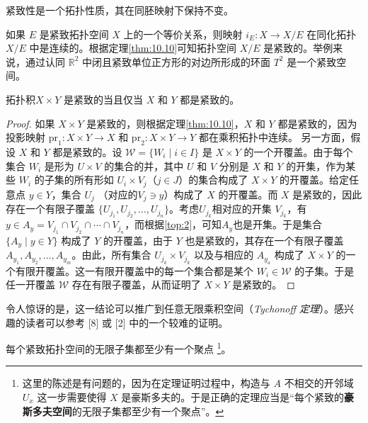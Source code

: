 	紧致性是一个拓扑性质，其在同胚映射下保持不变。

\begin{eg}\label{eg:10.16} 
	如果 $E$ 是紧致拓扑空间 $X$ 上的一个等价关系，则映射 $i_{E} :X\rightarrow X/E$ 在同化拓扑 $X/E$ 中是连续的。根据定理\ref{thm:10.10}可知拓扑空间 $X/E$ 是紧致的。举例来说，通过认同 $\mathbb{R}^{2}$ 中闭且紧致单位正方形的对边所形成的环面 $T^{2}$ 是一个紧致空间。
\end{eg}

\begin{theorem}\label{thm:10.11} 
	拓扑积$X\times Y$ 是紧致的当且仅当 $X$ 和 $Y$ 都是紧致的。
\end{theorem}

\begin{proof}
	如果 $X\times Y$ 是紧致的，则根据定理\ref{thm:10.10}，$X$ 和 $Y$ 都是紧致的，因为投影映射 $\mathrm{pr}_{1} :X\times Y\rightarrow X$ 和 $\mathrm{pr}_{2} :X\times Y\rightarrow Y$  都在乘积拓扑中连续。
	另一方面，假设 $X$ 和 $Y$ 都是紧致的。设 $\mathcal{W} =\{W_{i} \mid i\in I\}$ 是 $X\times Y$ 的一个开覆盖。由于每个集合 $W_{i}$ 是形为 $U\times V$ 的集合的并，其中 $U$ 和 $V$ 分别是 $X$ 和 $Y$ 的开集，作为某些 $W_{i}$ 的子集的所有形如 $U_{i} \times V_{j}$（$j\in J$）的集合构成了 $X\times Y$ 的开覆盖。给定任意点 $y\in Y$，集合 $U_{j}$ （对应的$V_{j} \ni y$）构成了 $X$ 的开覆盖。而 $X$ 是紧致的，因此存在一个有限子覆盖 $\{U_{j_{1}} ,U_{j_{2}} ,\dotsc ,U_{j_{n}} \}$。考虑$U_{j_{k}}$相对应的开集 $V_{j_{k}}$，有$y\in A_{y} =V_{j_{1}} \cap V_{j_{2}} \cap \cdots \cap V_{j_{n}}$，而根据\ref{top:2}，可知$A_{y}$也是开集。于是集合 $\{A_{y} \mid y\in Y\}$ 构成了 $Y$ 的开覆盖，由于 $Y$ 也是紧致的，其存在一个有限子覆盖 $A_{y_{1}} ,A_{y_{2}} ,\dotsc ,A_{y_{m}}$。由此，所有集合 $U_{j_{k}} \times V_{j_{k}}$ 以及与相应的 $A_{y_{a}}$ 构成了 $X\times Y$ 的一个有限开覆盖。这一有限开覆盖中的每一个集合都是某个 $W_{i} \in \mathcal{W}$ 的子集。于是任一开覆盖 $\mathcal{W}$ 存在有限子覆盖，从而证明了 $X\times Y$ 是紧致的。
\end{proof}

	令人惊讶的是，这一结论可以推广到任意无限乘积空间（\emph{Tychonoff 定理}）。感兴趣的读者可以参考 [8] 或 [2] 中的一个较难的证明。

\begin{theorem}\label{thm:10.12} 
	每个紧致拓扑空间的无限子集都至少有一个聚点 \footnote{这里的陈述是有问题的，因为在定理证明过程中，构造与 $A$ 不相交的开邻域 $U_{x}$ 这一步需要使得 $X$ 是豪斯多夫的。于是正确的定理应当是“每个紧致的\textbf{豪斯多夫空间}的无限子集都至少有一个聚点”。}。
\end{theorem}


